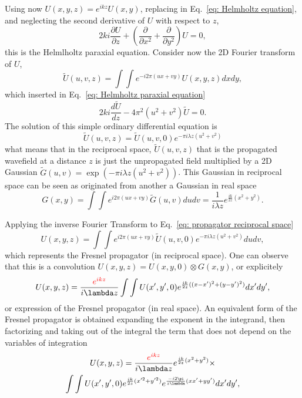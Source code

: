 \documentclass{iucr}              %
\newcommand{\inred}[1]{{\color{red}#1}}
\begin{document}
Using now $U(x,y,z)=e^{i k z}U(x,y)$, replacing in Eq.~\ref{eq: Helmholtz equation}, and neglecting the second derivative of $U$ with respect to $z$,
\begin{equation}\label{eq: Helmholtz paraxial equation}
2 k i \frac{\partial U}{\partial z} + \left( \frac{\partial}{\partial x^2} + \frac{\partial}{\partial y^2}\right) U = 0,
\end{equation}
this is the Helmlholtz paraxial equation. Consider now the 2D Fourier transform of $U$,
\begin{equation}\label{eq: ft of U}
\tilde{U}(u,v,z) = \int\int e^{-i 2 \pi (u x + v y) } U(x,y,z) dx dy,
\end{equation}
which inserted in Eq.~\ref{eq: Helmholtz paraxial equation} 
\begin{equation}
2 k i \frac{d \tilde{U}}{d z} - 4 \pi^2 (u^2 + v^2) \tilde{U}= 0.
\end{equation}
The solution of this simple ordinary differential equation is
\begin{equation}\label{eq: propagator reciprocal space}
\tilde{U}(u,v,z) = \tilde{U}(u,v,0)  e^{- \pi i \lambda z (u^2 + v^2) }
\end{equation}
what means that in the reciprocal space, $\tilde{U}(u,v,z)$ that is the propagated wavefield at a distance $z$ is just the unpropagated field multiplied by a 2D Gaussian $\tilde{G}(u,v) =  \exp(- \pi i \lambda z (u^2 + v^2) )$. 
This Gaussian in reciprocal space can be seen as originated from another a Gaussian in real space
\begin{equation}
G(x,y) = \int\int e^{i 2 \pi (u x + v y)} \tilde{G}(u,v) du dv = \frac{1}{i \lambda z} e^{\frac{i k}{2 z} (x^2 + y^2)}.
\end{equation}

Applying the inverse Fourier Transform to Eq.~\ref{eq: propagator reciprocal space}
\begin{equation}\label{eq: Fresnel in reciprocal space}
U(x,y,z) = \int\int e^{i 2 \pi (u x + v y) } \tilde{U}(u,v,0)  e^{- \pi i \lambda z (u^2 + v^2) } du dv,
\end{equation}
which represents the Fresnel propagator (in reciprocal space). 
One can observe that this is a convolution $U(x,y,z) = U(x,y,0) \otimes G(x,y) $, or explicitely
\begin{equation}\label{eq: Fresnel near field}
U(x,y,z) =  \frac{\inred{e^{i k z}}}{i \lambda z} \int\int U(x',y',0) e^{ \frac{i k}{2 z} ( (x-x')^2 + (y - y')^2) }  dx' dy',
\end{equation}
or expression of the Fresnel propagator (in real space). An equivalent form of the Fresnel propagator is obtained expanding the exponent in the integrand, then factorizing and taking out of the integral the term that does not depend on the variables of integration
\begin{multline}\label{eq: Fresnel far field}
U(x,y,z) =  \frac{\inred{e^{i k z}}}{i \lambda z} e^{\frac{i k}{2 z} (x^2 + y^2) } \times \\
\int\int U(x',y',0) e^{ \frac{i k}{2 z} (x'^2 + y'^2) } 
e^{ \frac{-i 2 \pi}{z \lambda} (x x' + y y') } dx' dy',
\end{multline}
\end{document}
